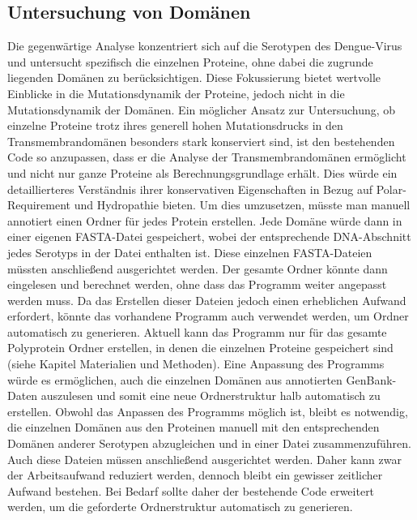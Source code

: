 \documentclass[german,version-2022-01]{uzl-thesis}
\begin{document}
\subsection{Untersuchung von Dom\"anen}
Die gegenw\"artige Analyse konzentriert sich auf die Serotypen des Dengue-Virus und untersucht spezifisch die einzelnen Proteine, ohne dabei die zugrunde liegenden Dom\"anen zu ber\"ucksichtigen. Diese Fokussierung bietet wertvolle Einblicke in die Mutationsdynamik der Proteine, jedoch nicht in die Mutationsdynamik der Dom\"anen. Ein m\"oglicher Ansatz zur Untersuchung, ob einzelne Proteine trotz ihres generell hohen Mutationsdrucks in den Transmembrandom\"anen besonders stark konserviert sind, ist den bestehenden Code so anzupassen, dass er die Analyse der Transmembrandom\"anen erm\"oglicht und nicht nur ganze Proteine als Berechnungsgrundlage erh\"alt. Dies w\"urde ein detaillierteres Verst\"andnis ihrer konservativen Eigenschaften in Bezug auf Polar-Requirement und Hydropathie bieten. Um dies umzusetzen, m\"usste man manuell annotiert einen Ordner f\"ur jedes Protein erstellen. Jede Dom\"ane w\"urde dann in einer eigenen FASTA-Datei gespeichert, wobei der entsprechende DNA-Abschnitt jedes Serotyps in der Datei enthalten ist. Diese einzelnen FASTA-Dateien m\"ussten anschlie\ss{}end ausgerichtet werden. Der gesamte Ordner k\"onnte dann eingelesen und berechnet werden, ohne dass das Programm weiter angepasst werden muss. Da das Erstellen dieser Dateien jedoch einen erheblichen Aufwand erfordert, k\"onnte das vorhandene Programm auch verwendet werden, um Ordner automatisch zu generieren. Aktuell kann das Programm nur f\"ur das gesamte Polyprotein Ordner erstellen, in denen die einzelnen Proteine gespeichert sind (siehe Kapitel Materialien und Methoden). Eine Anpassung des Programms w\"urde es erm\"oglichen, auch die einzelnen Dom\"anen aus annotierten GenBank-Daten auszulesen und somit eine neue Ordnerstruktur halb automatisch zu erstellen. Obwohl das Anpassen des Programms m\"oglich ist, bleibt es notwendig, die einzelnen Dom\"anen aus den Proteinen manuell mit den entsprechenden Dom\"anen anderer Serotypen abzugleichen und in einer Datei zusammenzuf\"uhren. Auch diese Dateien m\"ussen anschlie\ss{}end ausgerichtet werden. Daher kann zwar der Arbeitsaufwand reduziert werden, dennoch bleibt ein gewisser zeitlicher Aufwand bestehen. Bei Bedarf sollte daher der bestehende Code erweitert werden, um die geforderte Ordnerstruktur automatisch zu generieren.
\end{document}
